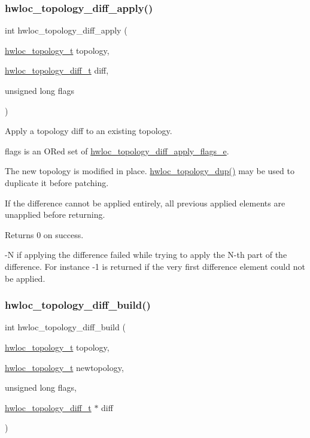 \subsubsection{\texorpdfstring{hwloc\+\_\+topology\+\_\+diff\+\_\+apply()}{hwloc\_topology\_diff\_apply()}}
{\footnotesize\ttfamily int hwloc\+\_\+topology\+\_\+diff\+\_\+apply (\begin{DoxyParamCaption}\item[{\hyperlink{a00186_ga9d1e76ee15a7dee158b786c30b6a6e38}{hwloc\+\_\+topology\+\_\+t}}]{topology,  }\item[{\hyperlink{a00225_ga2cf1b17332fe5d95f2198f6340cfd288}{hwloc\+\_\+topology\+\_\+diff\+\_\+t}}]{diff,  }\item[{unsigned long}]{flags }\end{DoxyParamCaption})}



Apply a topology diff to an existing topology. 

{\ttfamily flags} is an OR\textquotesingle{}ed set of \hyperlink{a00225_gada4c1273ce020afaf02b649496f7edf5}{hwloc\+\_\+topology\+\_\+diff\+\_\+apply\+\_\+flags\+\_\+e}.

The new topology is modified in place. \hyperlink{a00186_ga62a161fc5e6f120344dc69a7bee4e587}{hwloc\+\_\+topology\+\_\+dup()} may be used to duplicate it before patching.

If the difference cannot be applied entirely, all previous applied elements are unapplied before returning.

\begin{DoxyReturn}{Returns}
0 on success.

-\/N if applying the difference failed while trying to apply the N-\/th part of the difference. For instance -\/1 is returned if the very first difference element could not be applied. 
\end{DoxyReturn}
\mbox{\label{a00225_ga8a1754f69fbb31364ea3ea2c39827c9f}} 
\subsubsection{\texorpdfstring{hwloc\+\_\+topology\+\_\+diff\+\_\+build()}{hwloc\_topology\_diff\_build()}}
{\footnotesize\ttfamily int hwloc\+\_\+topology\+\_\+diff\+\_\+build (\begin{DoxyParamCaption}\item[{\hyperlink{a00186_ga9d1e76ee15a7dee158b786c30b6a6e38}{hwloc\+\_\+topology\+\_\+t}}]{topology,  }\item[{\hyperlink{a00186_ga9d1e76ee15a7dee158b786c30b6a6e38}{hwloc\+\_\+topology\+\_\+t}}]{newtopology,  }\item[{unsigned long}]{flags,  }\item[{\hyperlink{a00225_ga2cf1b17332fe5d95f2198f6340cfd288}{hwloc\+\_\+topology\+\_\+diff\+\_\+t} $\ast$}]{diff }\end{DoxyParamCaption})}



